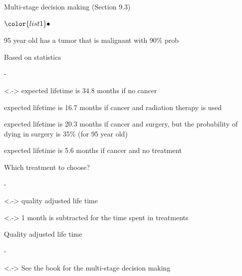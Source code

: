 \documentclass[t]{beamer}
\newenvironment{list1}{
   \begin{list}{$\color{list1}\bullet$}{\itemsep=6pt}}{
  \end{list}}
\newenvironment{list2}{
  \begin{list}{-}{\baselineskip=12pt\itemsep=2pt}}{
  \end{list}}
\begin{document}
\begin{frame}{Multi-stage decision making (Section 9.3)}

  \vspace{-0.3\baselineskip}
  \begin{list1}
  \item<+-> 95 year old has a tumor that is malignant with 90\% prob
  \item<+-> Based on statistics
    \begin{list2}
    \item<.-> expected lifetime is 34.8 months if no cancer
    \item<+-> expected lifetime is 16.7 months if cancer and radiation therapy is used
    \item<+-> expected lifetime is 20.3 months if cancer and surgery, but the probability of dying in surgery is 35\% (for 95 year old)
    \item<+-> expected lifetime is 5.6 months if cancer and no treatment
    \end{list2}
  \item<+-> Which treatment to choose?
    \begin{list2}
    \item<.-> quality adjusted life time
    \item<.-> 1 month is subtracted for the time spent in treatments
    \end{list2}
   \item<+-> Quality adjusted life time
    \begin{list2}
    \item<.-> See the book for the multi-stage decision making
    \end{list2}
\end{list1}

\end{frame}
\end{document}
